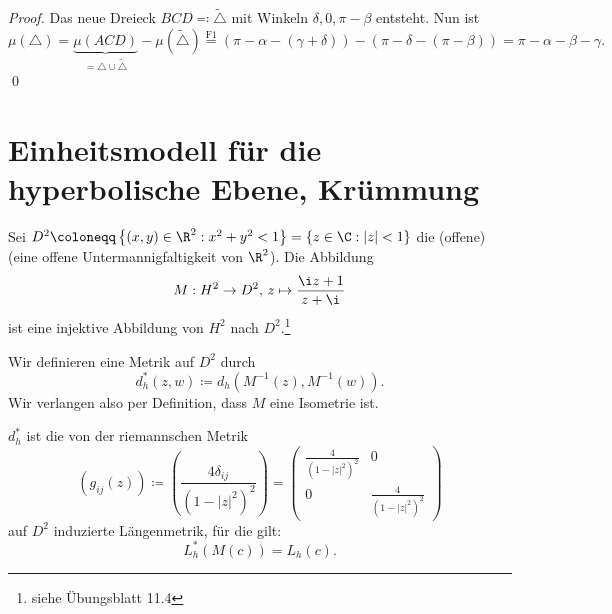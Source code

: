 \begin{remark}
\begin{enumerate}
\begin{proof}
      Das neue Dreieck \( BCD \eqqcolon \widetilde{\triangle} \) mit Winkeln \( \delta, 0, \pi - \beta \) entsteht. Nun ist
      \begin{equation*}
        \mu(\triangle) = \underbrace{\mu(ACD)}_{= \triangle \cup \widetilde{\triangle}} - \mu(\widetilde{\triangle}) \overset{\text{F1}}{=} \left( \pi - \alpha - (\gamma + \delta) \right) - \left( \pi - \delta - (\pi - \beta) \right) = \pi - \alpha - \beta - \gamma\text{.}
      \end{equation*} \qed{}
    \end{proof}
  \end{enumerate}
\end{remark}

\section{Einheitsmodell für die hyperbolische Ebene, Krümmung}

Sei \( D^2 \coloneqq \left \{ (x,y) \in \R^2 : x^2 + y^2 < 1 \right \} = \left \{ z \in \C : \left\vert z \right\vert < 1 \right \} \) die (offene)  (eine offene Untermannigfaltigkeit von \( \R^2 \)). Die Abbildung
\begin{equation*}
  M : H^2 \to D^2\text{,} \ z \mapsto \frac{\i z + 1}{z + \i}
\end{equation*}
ist eine injektive Abbildung von \( H^2 \) nach \( D^2 \).\footnote{siehe Übungsblatt 11.4}

Wir definieren eine Metrik auf \( D^2 \) durch
\begin{equation*}
  d_h^\ast(z,w) \coloneqq d_h\left( M^{-1}(z),M^{-1}(w) \right)\text{.}
\end{equation*}
Wir verlangen also per Definition, dass \( M \) eine Isometrie ist.

\begin{remark}
  \( d_h^\ast \) ist die von der riemannschen Metrik
  \begin{equation*}
    \left( g_{ij}(z) \right) \coloneqq \left( \frac{4\delta_{ij}}{{\left( 1-\left\vert z \right\vert^2 \right)}^2} \right) = \begin{pmatrix}
      \frac{4}{{\left( 1-\left\vert z \right\vert^2 \right)}^2} & 0 \\
      0 & \frac{4}{{\left( 1-\left\vert z \right\vert^2 \right)}^2}
    \end{pmatrix}
  \end{equation*}
  auf \( D^2 \) induzierte Längenmetrik, für die gilt:
  \begin{equation*}
    L_h^\ast(M(c)) = L_h(c)\text{.}
  \end{equation*}
\end{remark}

